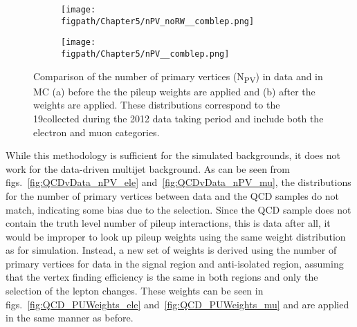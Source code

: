\begin{figure}[!hbt]
    \centering
    \begin{subfigure}[t]{0.48\textwidth}
      \texttt{[image: \\figpath/Chapter5/nPV\_noRW\_\_comblep.png]}
      \caption{}
      \label{fig:npv_no_pileup_reweight}
    \end{subfigure}
    \begin{subfigure}[t]{0.48\textwidth}
      \texttt{[image: \\figpath/Chapter5/nPV\_\_comblep.png]}
      \caption{}
      \label{fig:npv_pileup_reweight}
    \end{subfigure}
    \caption{Comparison of the number of primary vertices (N\textsubscript{PV}) in data and in MC (a) before the the pileup weights are applied and (b) after the weights are applied. These distributions correspond to the 19\fbinv collected during the 2012 data taking period and include both the electron and muon categories.}
    \label{fig:npv_comparison}
\end{figure}

While this methodology is sufficient for the simulated backgrounds, it does not work for the data-driven multijet background.
As can be seen from figs.~\ref{fig:QCDvData_nPV_ele} and~\ref{fig:QCDvData_nPV_mu}, the distributions for the number of primary vertices between data and the QCD samples do not match, indicating some bias due to the selection.
Since the QCD sample does not contain the truth level number of pileup interactions, this is data after all, it would be improper to look up pileup weights using the same weight distribution as for simulation.
Instead, a new set of weights is derived using the number of primary vertices for data in the signal region and anti-isolated region, assuming that the vertex finding efficiency is the same in both regions and only the selection of the lepton changes.
These weights can be seen in figs.~\ref{fig:QCD_PUWeights_ele} and~\ref{fig:QCD_PUWeights_mu} and are applied in the same manner as before.

